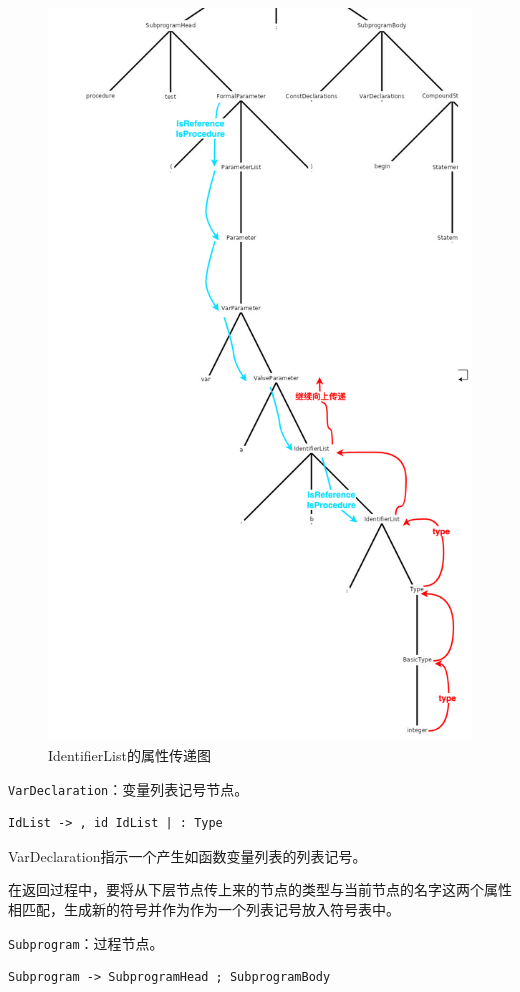\documentclass[../main.tex]{subfiles}
\begin{document}
\begin{figure}[htp]
\centering
\includegraphics[width=0.8\linewidth ]{assets/类型检查/IdentifierList.png}
\caption{IdentifierList的属性传递图}
\label{fig:IdentifierList}
\end{figure}

\texttt{VarDeclaration}：变量列表记号节点。

\begin{lstlisting}[style=grammar]
IdList -> , id IdList | : Type
\end{lstlisting}

VarDeclaration指示一个产生如函数变量列表的列表记号。

在返回过程中，要将从下层节点传上来的节点的类型与当前节点的名字这两个属性相匹配，生成新的符号并作为作为一个列表记号放入符号表中。

\texttt{Subprogram}：过程节点。

\begin{lstlisting}[style=grammar]
Subprogram -> SubprogramHead ; SubprogramBody    
\end{lstlisting}
\end{document}
